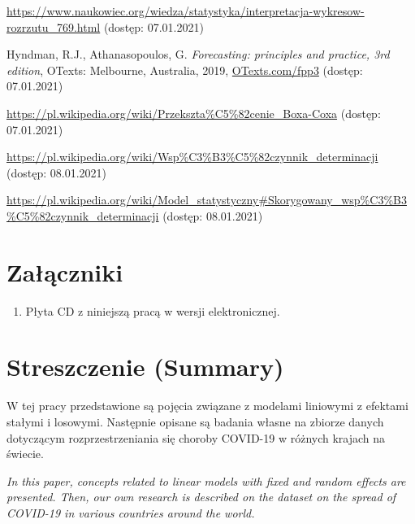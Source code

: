 \documentclass[12pt]{mwbk}
\theoremstyle{plain}
\theoremstyle{definition}
\theoremstyle{remark}
\begin{document}
\begin{thebibliography}{99}
 \url{https://www.naukowiec.org/wiedza/statystyka/interpretacja-wykresow-rozrzutu_769.html} (dostęp: 07.01.2021)

 Hyndman, R.J.,  Athanasopoulos, G. \emph{Forecasting: principles and practice, 3rd edition}, OTexts: Melbourne, Australia, 2019, \url{OTexts.com/fpp3} (dostęp: 07.01.2021)

 \url{https://pl.wikipedia.org/wiki/Przekszta\%C5\%82cenie\_Boxa-Coxa} (dostęp: 07.01.2021)

 \url{https://pl.wikipedia.org/wiki/Wsp\%C3\%B3\%C5\%82czynnik\_determinacji} (dostęp: 08.01.2021)

 \url{https://pl.wikipedia.org/wiki/Model\_statystyczny#Skorygowany\_wsp\%C3\%B3\%C5\%82czynnik\_determinacji} (dostęp: 08.01.2021)

\end{thebibliography}



\listoffigures

\listoftables


\chapter*{Załączniki}
\begin{enumerate}
\item Płyta CD z niniejszą pracą w wersji elektronicznej.
\end{enumerate}




\chapter*{Streszczenie (Summary)}

\bigskip
\bigskip

\begin{center}
  \textbf{\tytul}
\end{center}

W tej pracy przedstawione są pojęcia związane z modelami liniowymi z efektami stałymi i losowymi. Następnie opisane są badania własne na zbiorze danych dotyczącym rozprzestrzeniania się choroby COVID-19 w różnych krajach na świecie.


\bigskip

\begin{center}
  \textbf{\textit{\tytulangielski}}
\end{center}



{\it
In this paper, concepts related to linear models with fixed and random effects are presented. Then, our own research is described on the dataset on the spread of COVID-19 in various countries around the world.
}
\end{document}
